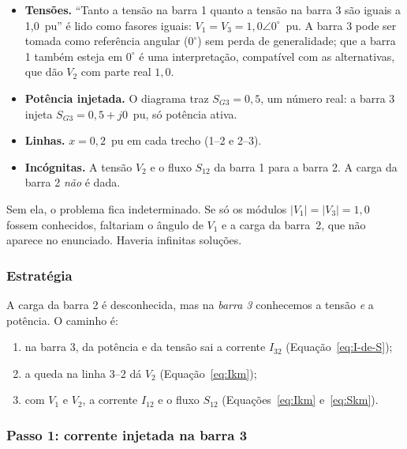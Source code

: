 \documentclass[a4paper,11pt]{article}
\numberwithin{equation}{section}
\numberwithin{figure}{section}
\numberwithin{table}{section}
\newcommand{\passo}[1]{{\color{blue_theme}\bfseries #1}\enspace}
\begin{document}
\begin{itemize}
  \item \passo{Tensões.} \enquote{Tanto a tensão na barra 1 quanto a tensão
        na barra 3 são iguais a 1,0~pu} é lido como fasores iguais:
        $V_1 = V_3 = 1{,}0\angle 0^\circ$~pu. A barra 3 pode ser tomada como
        referência angular ($0^\circ$) sem perda de generalidade; que a
        barra 1 também esteja em $0^\circ$ é uma interpretação, compatível
        com as alternativas, que dão $V_2$ com parte real $1{,}0$.
  \item \passo{Potência injetada.} O diagrama traz $S_{G3} = 0{,}5$, um
        número real: a barra 3 injeta $S_{G3} = 0{,}5 + j0$~pu, só potência
        ativa.
  \item \passo{Linhas.} $x = 0{,}2$~pu em cada trecho (1--2 e 2--3).
  \item \passo{Incógnitas.} A tensão $V_2$ e o fluxo $S_{12}$ da barra 1
        para a barra 2. A carga da barra 2 \emph{não} é dada.
\end{itemize}

\begin{observacao}[title={Por que a leitura $V_1 = V_3 = 1\angle 0^\circ$ é necessária}]
  Sem ela, o problema fica indeterminado. Se só os módulos $|V_1| = |V_3| =
  1{,}0$ fossem conhecidos, faltariam o ângulo de $V_1$ e a carga da
  barra~2, que não aparece no enunciado. Haveria infinitas soluções.
\end{observacao}

\subsubsection{Estratégia}

A carga da barra 2 é desconhecida, mas na \emph{barra 3} conhecemos a
tensão \emph{e} a potência. O caminho é:
\begin{enumerate}[label=\arabic*.]
  \item na barra 3, da potência e da tensão sai a corrente $I_{32}$
        (Equação~\eqref{eq:I-de-S});
  \item a queda na linha 3--2 dá $V_2$ (Equação~\eqref{eq:Ikm});
  \item com $V_1$ e $V_2$, a corrente $I_{12}$ e o fluxo $S_{12}$
        (Equações~\eqref{eq:Ikm} e~\eqref{eq:Skm}).
\end{enumerate}

\subsubsection{Passo 1: corrente injetada na barra 3}
\end{document}

